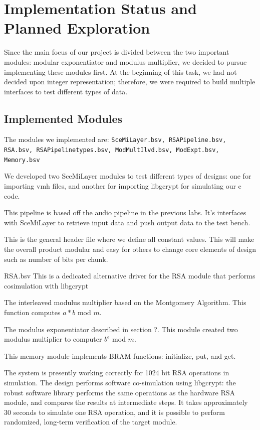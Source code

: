 \documentclass[12pt]{article}
\begin{document}
\section{Implementation Status and Planned Exploration}
Since the main focus of our project is divided between the two important modules: modular exponentiator and modulus multiplier, we decided to pursue implementing these modules first.  At the beginning of this task, we had not decided upon integer representation; therefore, we were required to build multiple interfaces to test different types of data.  \\


\subsection{Implemented Modules}
The modules we implemented are:  {\tt SceMiLayer.bsv, RSAPipeline.bsv, RSA.bsv, RSAPipelinetypes.bsv,  ModMultIlvd.bsv, ModExpt.bsv, Memory.bsv}

\begin{description}
  \item[SceMiLayer.bsv] We developed two SceMiLayer modules to test different types of designs: one for importing vmh files, and another for importing libgcrypt for simulating our c code.  
  \item[RSAPipeline.bsv] This pipeline is based off the audio pipeline in the previous labs.  It's interfaces with SceMiLayer to retrieve input data and push output data to the test bench.
  \item[RSAPipelinetypes.bsv] This is the general header file where we define all constant values.  This will make the overall product modular and easy for others to change core elements of design such as number of bits per chunk.
  \item{RSA.bsv} This is a dedicated alternative driver for the RSA module that performs cosimulation with libgcrypt
  \item[ModMultIlvd.bsv] The interleaved modulus multiplier based on the Montgomery Algorithm.  This function computes $a*b$ mod $m$.
  \item[ModExpt.bsv] The modulus exponentiator described in section ?.  This module created two modulus multiplier to computer $b^e$ mod $m$.
  \item[Memory.bsv] This memory module implements BRAM functions: initialize, put, and get.  
\end{description}

The system is presently working correctly for 1024 bit RSA operations in simulation. The design performs software co-simulation using libgcrypt: the robust software library
 performs the same operations as the hardware RSA module, and compares the results at intermediate steps. It takes approximately 30 seconds to simulate one RSA operation, and
it is possible to perform randomized, long-term verification of the target module. 
\end{document}
